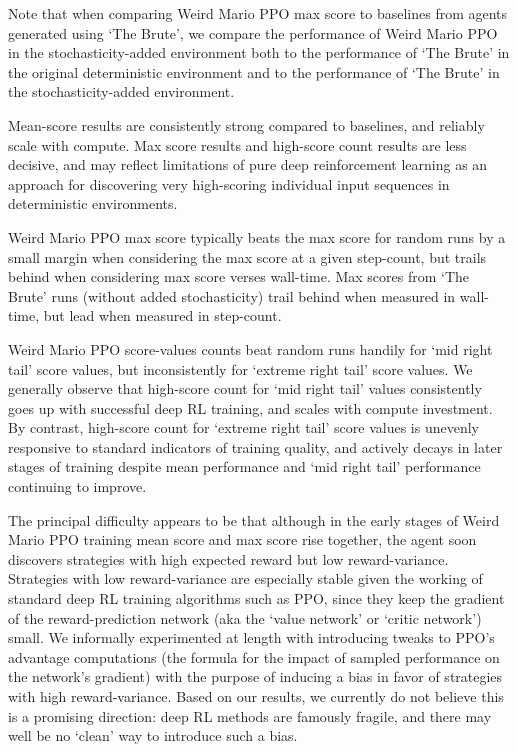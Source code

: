 \documentclass[]{article}
\begin{document}
Note that when comparing Weird Mario PPO max score to baselines from
agents generated using `The Brute', we compare the performance of Weird
Mario PPO in the stochasticity-added environment both to the performance
of `The Brute' in the original deterministic environment and to the
performance of `The Brute' in the stochasticity-added environment.

Mean-score results are consistently strong compared to baselines, and
reliably scale with compute. Max score results and high-score count
results are less decisive, and may reflect limitations of pure deep
reinforcement learning as an approach for discovering very high-scoring
individual input sequences in deterministic environments.

Weird Mario PPO max score typically beats the max score for random runs
by a small margin when considering the max score at a given step-count,
but trails behind when considering max score verses wall-time. Max
scores from `The Brute' runs (without added stochasticity) trail behind
when measured in wall-time, but lead when measured in step-count.

Weird Mario PPO score-values counts beat random runs handily for `mid
right tail' score values, but inconsistently for `extreme right tail'
score values. We generally observe that high-score count for `mid right
tail' values consistently goes up with successful deep RL training, and
scales with compute investment. By contrast, high-score count for
`extreme right tail' score values is unevenly responsive to standard
indicators of training quality, and actively decays in later stages of
training despite mean performance and `mid right tail' performance
continuing to improve.

The principal difficulty appears to be that although in the early stages
of Weird Mario PPO training mean score and max score rise together, the
agent soon discovers strategies with high expected reward but low
reward-variance. Strategies with low reward-variance are especially
stable given the working of standard deep RL training algorithms such as
PPO, since they keep the gradient of the reward-prediction network (aka
the `value network' or `critic network') small. We informally
experimented at length with introducing tweaks to PPO's advantage
computations (the formula for the impact of sampled performance on the
network's gradient) with the purpose of inducing a bias in favor of
strategies with high reward-variance. Based on our results, we currently
do not believe this is a promising direction: deep RL methods are
famously fragile, and there may well be no `clean' way to introduce such
a bias.
\end{document}
